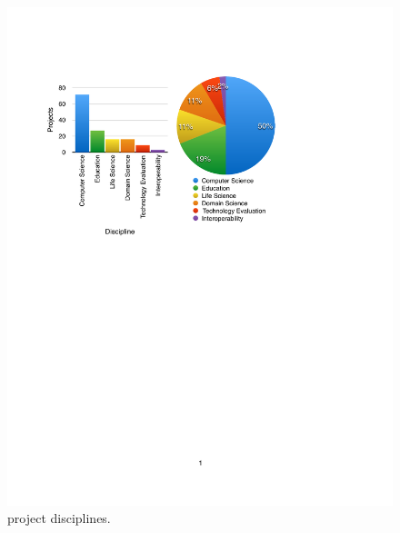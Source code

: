 \begin{figure}[htb]
  \centering
    \includegraphics[width=1.0\textwidth]{images/project-disciplines.pdf}
  \caption{project disciplines.}
\end{figure}

